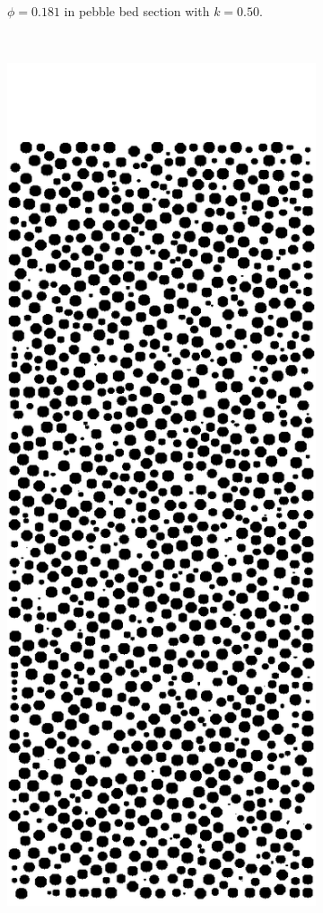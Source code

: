 \begin{figure}[ht]
\begin{subfigure}[b]{0.2\textwidth}
                \caption{$\phi = 0.181$ in pebble bed section with $k = 0.50$.}
                \label{fig:2d-res20-k050}
        \end{subfigure}%
        ~
        \begin{subfigure}[b]{0.2\textwidth}
                \includegraphics[width=\textwidth]{figures/lbm/2d-res20-k075.png}

\end{subfigure}
\end{figure}
